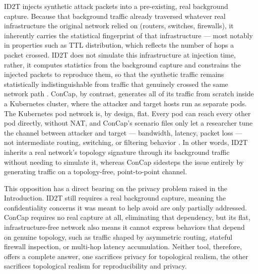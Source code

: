 \documentclass[conference]{IEEEtran}
\begin{document}
ID2T injects synthetic attack packets into a pre-existing, real
background capture. Because that background traffic already traversed
whatever real infrastructure the original network relied on (routers,
switches, firewalls), it inherently carries the statistical fingerprint
of that infrastructure --- most notably in properties such as TTL
distribution, which reflects the number of hops a packet crossed.
ID2T does not simulate this infrastructure at injection time, rather,
it computes statistics from the background capture and constrains the
injected packets to reproduce them, so that the synthetic traffic
remains statistically indistinguishable from traffic that genuinely
crossed the same network path \cite{id2t2021}. ConCap, by contrast,
generates all of its traffic from scratch inside a Kubernetes cluster,
where the attacker and target hosts run as separate pods. The
Kubernetes pod network is, by design, flat. Every pod can reach every
other pod directly, without NAT, and ConCap's scenario files only let
a researcher tune the channel between attacker and target ---
bandwidth, latency, packet loss --- not intermediate routing,
switching, or filtering behavior \cite{concap2026}. In other words,
ID2T inherits a real network's topology signature through its
background traffic without needing to simulate it, whereas ConCap
sidesteps the issue entirely by generating traffic on a
topology-free, point-to-point channel.

This opposition has a direct bearing on the privacy problem raised in
the Introduction. ID2T still requires a real background capture,
meaning the confidentiality concerns it was meant to help avoid are
only partially addressed. ConCap requires no real capture at all,
eliminating that dependency, but its flat, infrastructure-free
network also means it cannot express behaviors that depend on genuine
topology, such as traffic shaped by asymmetric routing, stateful
firewall inspection, or multi-hop latency accumulation. Neither tool,
therefore, offers a complete answer, one sacrifices privacy for
topological realism, the other sacrifices topological realism for
reproducibility and privacy.
\end{document}
